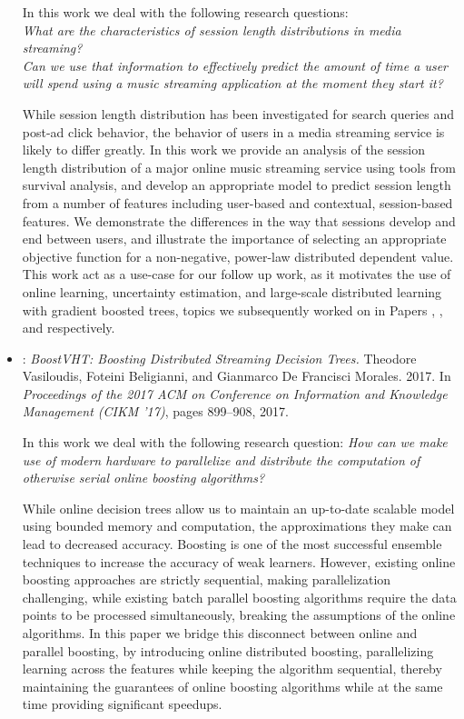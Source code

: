 \begin{itemize}
	In this work we deal with the following research questions:\\
	\emph{What are the characteristics of session length distributions in media streaming?\\
	Can we use that information to effectively predict the amount of time a user will spend using
	a music streaming application at the moment they start it?}

	While session length distribution has been investigated for search
	queries and post-ad click behavior, the behavior of users in a media
	streaming service is likely to differ greatly.
	In this work we provide an analysis of the session length distribution
	of a major online music streaming service using tools from survival analysis, and develop an appropriate
	model to predict session length from a number of features including
	user-based and contextual, session-based features.
	We demonstrate the differences in the way that sessions develop and end
	between users, and illustrate the importance of selecting an appropriate
	objective function for a non-negative, power-law distributed dependent value.
	This work act as a use-case for our follow up work, as it motivates the use of online learning,
	uncertainty estimation, and large-scale distributed learning with gradient boosted
	trees, topics we subsequently worked on in Papers \boostvhtNum, \uncertaintreesNum,
	and \blockgbtNum respectively.

	\item \textbf{\boostvht}: \emph{BoostVHT: Boosting Distributed Streaming Decision Trees.} Theodore Vasiloudis, Foteini Beligianni, and Gianmarco De Francisci Morales. 2017.  In \emph{Proceedings of the 2017 ACM on Conference on Information and Knowledge Management (CIKM '17)}, pages 899--908, 2017.

	In this work we deal with the following research question:
	\emph{How can we make use of modern hardware to parallelize and distribute
	the computation of otherwise serial online boosting algorithms?}

	While online decision trees allow us to maintain an up-to-date scalable
	model using bounded memory and computation, the approximations they make
	can lead to decreased accuracy.
	Boosting is one of the most successful ensemble techniques to increase the
	accuracy of weak learners. However, existing online boosting approaches
	are strictly sequential, making parallelization challenging, while existing batch parallel boosting algorithms
	require the data points to be processed simultaneously, breaking the assumptions
	of the online algorithms. In this paper we bridge
	this disconnect between online and parallel boosting, by introducing
	online distributed boosting, parallelizing learning
	across the features while keeping the algorithm sequential, thereby maintaining the guarantees of online boosting
	algorithms while at the same time providing significant speedups.


\end{itemize}
